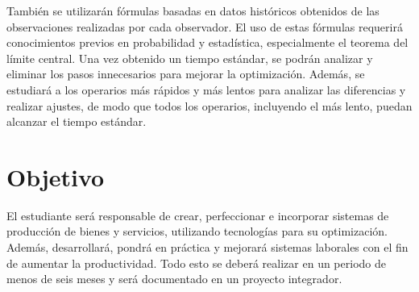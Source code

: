     También se utilizarán fórmulas basadas en datos históricos obtenidos de las observaciones realizadas por cada observador. El uso de estas fórmulas requerirá conocimientos previos en probabilidad y estadística, especialmente el teorema del límite central. Una vez obtenido un tiempo estándar, se podrán analizar y eliminar los pasos innecesarios para mejorar la optimización. Además, se estudiará a los operarios más rápidos y más lentos para analizar las diferencias y realizar ajustes, de modo que todos los operarios, incluyendo el más lento, puedan alcanzar el tiempo estándar.
    
    
    \section{Objetivo}
    
    El estudiante será responsable de crear, perfeccionar e incorporar sistemas de producción de bienes y servicios, utilizando tecnologías para su optimización. Además, desarrollará, pondrá en práctica y mejorará sistemas laborales con el fin de aumentar la productividad. Todo esto se deberá realizar en un periodo de menos de seis meses y será documentado en un proyecto integrador.
    
